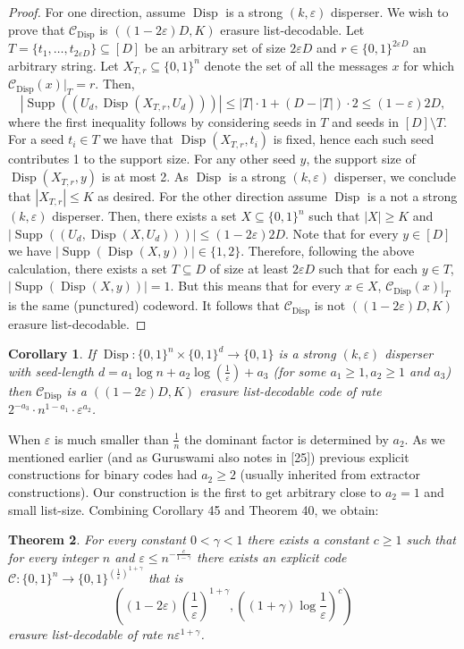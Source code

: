 \documentclass[10pt,a4paper]{article}
\newtheorem{theorem}{Theorem}
\newtheorem{corollary}[theorem]{Corollary}
\DeclareMathOperator{\Supp}{Supp}
\DeclareMathOperator{\Disp}{Disp}
\begin{document}
\begin{proof}
For one direction, assume $\Disp$ is a strong $(k,\varepsilon)$ disperser. We wish to prove that $\mathcal C_{\Disp}$ is $((1-2\varepsilon)D,K)$ erasure list-decodable. Let $T=\{t_1,\ldots,t_{2\varepsilon D}\}\subseteq[D]$ be an arbitrary set of size $2\varepsilon D$ and $r\in\{0,1\}^{2\varepsilon D}$ an arbitrary string. Let $X_{T,r}\subseteq\{0,1\}^n$ denote the set of all the messages $x$ for which $\mathcal C_{\Disp}(x)|_T=r$. Then,
\[|\Supp((U_d,\Disp(X_{T,r},U_d)))|\le|T|\cdot1+(D-|T|)\cdot2\le(1-\varepsilon)2D,\]
where the first inequality follows by considering seeds in $T$ and seeds in $[D]\setminus T$. For a seed $t_i\in T$ we have that $\Disp(X_{T,r},t_i)$ is fixed, hence each such seed contributes 1 to the support size. For any other seed $y$, the support size of $\Disp(X_{T,r},y)$ is at most 2. As $\Disp$ is a strong $(k,\varepsilon)$ disperser, we conclude that $|X_{T,r}|\le K$ as desired.
For the other direction assume $\Disp$ is a not a strong $(k,\varepsilon)$ disperser. Then, there exists a set $X\subseteq\{0,1\}^n$ such that $|X|\ge K$ and $|\Supp((U_d,\Disp(X,U_d)))|\le(1-2\varepsilon)2D$. Note that for every $y\in[D]$ we have $|\Supp(\Disp(X,y))|\in\{1,2\}$. Therefore, following the above calculation, there exists a set $T\subseteq D$ of size at least $2\varepsilon D$ such that for each $y\in T$, $|\Supp(\Disp(X,y))|=1$. But this means that for every $x\in X$, $\mathcal C_{\Disp}(x)|_T$ is the same (punctured) codeword. It follows that $\mathcal C_{\Disp}$ is not $((1-2\varepsilon)D,K)$ erasure list-decodable.
\end{proof}
\begin{corollary}
If $\Disp:\{0,1\}^n\times\{0,1\}^d\to\{0,1\}$ is a strong $(k,\varepsilon)$ disperser with seed-length $d=a_1\log n+a_2\log(\frac1\varepsilon)+a_3$ (for some $a_1\ge1,a_2\ge1$ and $a_3$) then $\mathcal C_{\Disp}$ is a $((1-2\varepsilon)D,K)$ erasure list-decodable code of rate $2^{-a_3}\cdot n^{1-a_1}\cdot\varepsilon^{a_2}$.
\end{corollary}
When $\varepsilon$ is much smaller than $\frac1n$ the dominant factor is determined by $a_2$. As we mentioned earlier (and as Guruswami also notes in [25]) previous explicit constructions for binary codes had $a_2\ge2$ (usually inherited from extractor constructions). Our construction is the first to get arbitrary close to $a_2=1$ and small list-size. Combining Corollary 45 and Theorem 40, we obtain:
\begin{theorem}
For every constant $0<\gamma<1$ there exists a constant $c\ge1$ such that for every integer $n$ and $\varepsilon\le n^{-\frac c{1-\gamma}}$ there exists an explicit code $\mathcal C:\{0,1\}^n\to\{0,1\}^{(\frac1\varepsilon)^{1+\gamma}}$ that is
\[\left((1-2\varepsilon)\left(\frac1\varepsilon\right)^{1+\gamma},\left((1+\gamma)\log\frac1\varepsilon\right)^c\right)\]
erasure list-decodable of rate $n\varepsilon^{1+\gamma}$.
\end{theorem}
\end{document}
